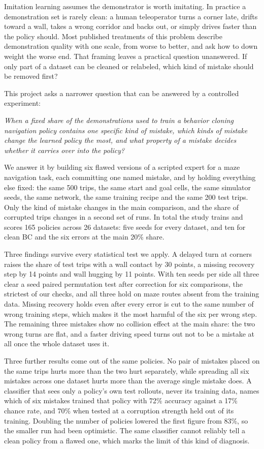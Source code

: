 \documentclass[conference]{IEEEtran}
\begin{document}
Imitation learning assumes the demonstrator is worth imitating. In practice a demonstration set is rarely clean:
a human teleoperator turns a corner late, drifts toward a wall, takes a wrong corridor and backs out, or simply
drives faster than the policy should. Most published treatments of this problem describe demonstration quality
with one scale, from worse to better, and ask how to down weight the worse end. That framing leaves a practical
question unanswered. If only part of a dataset can be cleaned or relabeled, which kind of mistake should be
removed first?

This project asks a narrower question that can be answered by a controlled experiment:

\emph{When a fixed share of the demonstrations used to train a behavior cloning navigation policy contains one
specific kind of mistake, which kinds of mistake change the learned policy the most, and what property of a
mistake decides whether it carries over into the policy?}

We answer it by building six flawed versions of a scripted expert for a maze navigation task, each committing one
named mistake, and by holding everything else fixed: the same 500 trips, the same start and goal cells, the same
simulator seeds, the same network, the same training recipe and the same 200 test trips. Only the kind of mistake
changes in the main comparison, and the share of corrupted trips changes in a second set of runs. In total the
study trains and scores 165 policies across 26 datasets: five seeds for every dataset, and ten for clean BC and
the six errors at the main 20\% share.

Three findings survive every statistical test we apply. A delayed turn at corners raises the share of test trips
with a wall contact by 30 points, a missing recovery step by 14 points and wall hugging by 11 points. With ten
seeds per side all three clear a seed paired permutation test after correction for six comparisons, the
strictest of our checks, and all three hold on maze routes absent from the training data. Missing recovery holds
even after every error is cut to the same number of wrong training steps, which makes it the most harmful of
the six per wrong step. The remaining three mistakes show no collision effect at the main share: the two wrong
turns are flat, and a faster driving speed turns out not to be a mistake at all once the whole dataset uses it.

Three further results come out of the same policies. No pair of mistakes placed on the same trips hurts more than
the two hurt separately, while spreading all six mistakes across one dataset hurts more than the average single
mistake does. A classifier that sees only a policy's own test rollouts, never its training data, names which of
six mistakes trained that policy with 72\% accuracy against a 17\% chance rate, and 70\% when tested at a
corruption strength held out of its training. Doubling the number of policies lowered the first figure from 83\%,
so the smaller run had been optimistic. The same classifier cannot reliably tell a clean policy from a flawed one,
which marks the limit of this kind of diagnosis.
\end{document}
